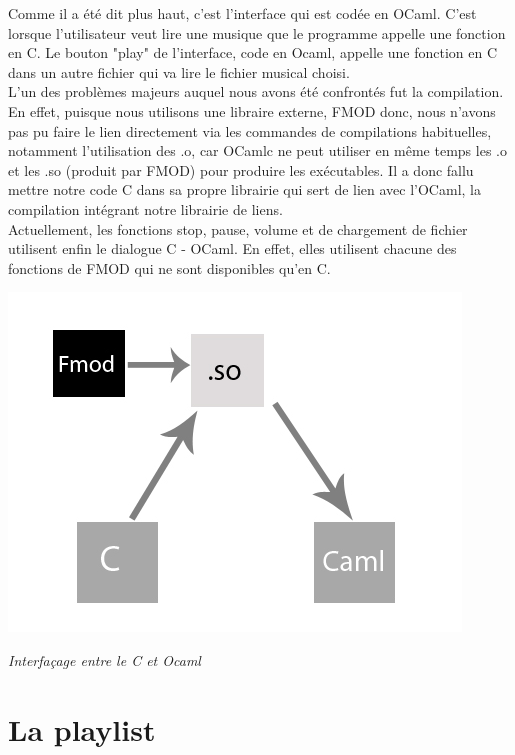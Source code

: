 \documentclass[12pt,a4paper]{report}
\begin{document}
Comme il a été dit plus haut, c'est l'interface qui est codée en OCaml. C'est lorsque l'utilisateur veut lire une musique que le programme appelle une fonction en C. Le bouton "play" de l'interface, code en Ocaml, appelle une fonction en C dans un autre fichier qui va lire le fichier musical choisi.\\

L'un des problèmes majeurs auquel nous avons été confrontés fut la compilation. En effet, puisque nous utilisons une libraire externe, FMOD donc, nous n'avons pas pu faire le lien directement via les commandes de compilations habituelles, notamment l'utilisation des .o, car OCamlc ne peut utiliser en même temps les .o et les .so (produit par FMOD) pour produire les exécutables. Il a donc fallu mettre notre code C dans sa propre librairie qui sert de lien avec l'OCaml, la compilation intégrant notre librairie de liens.\\

Actuellement, les fonctions stop, pause, volume et de chargement de fichier utilisent enfin le dialogue C - OCaml. En effet, elles utilisent chacune des fonctions de FMOD qui ne sont disponibles qu'en C.\\

\begin{center}
\includegraphics[scale=0.7]{c_caml.jpg}

\it{Interfaçage entre le C et Ocaml}
\end{center}

\chapter{La playlist}
\end{document}

